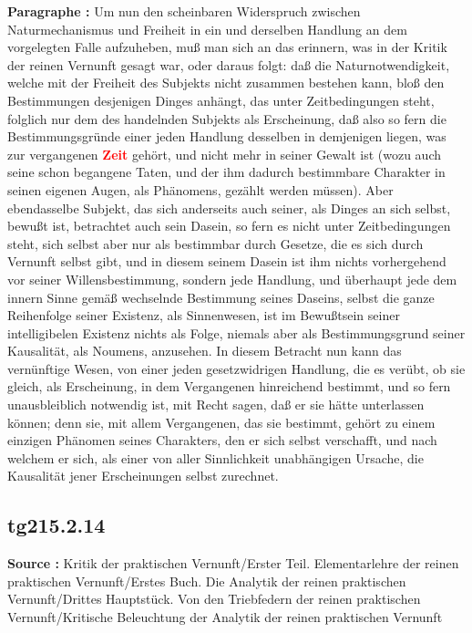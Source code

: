 \documentclass[a4paper,12pt,twoside]{book}
\newcommand{\match}[1]{\textcolor{red}{\textbf{#1}}}
\begin{document}
	\noindent\textbf{Paragraphe : }Um nun den scheinbaren Widerspruch zwischen Naturmechanismus und Freiheit in ein und derselben Handlung an dem vorgelegten Falle aufzuheben, muß man sich an das  erinnern, was in der Kritik der reinen Vernunft gesagt war, oder daraus folgt: daß die Naturnotwendigkeit, welche mit der Freiheit des Subjekts nicht zusammen bestehen kann, bloß den Bestimmungen desjenigen Dinges anhängt, das unter Zeitbedingungen steht, folglich nur dem des handelnden Subjekts als Erscheinung, daß also so fern die Bestimmungsgründe einer jeden Handlung desselben in demjenigen liegen, was zur vergangenen \match{Zeit} gehört, und nicht mehr in seiner Gewalt ist (wozu auch seine schon begangene Taten, und der ihm dadurch bestimmbare Charakter in seinen eigenen Augen, als Phänomens, gezählt werden müssen). Aber ebendasselbe Subjekt, das sich anderseits auch seiner, als Dinges an sich selbst, bewußt ist, betrachtet auch sein Dasein, so fern es nicht unter Zeitbedingungen steht, sich selbst aber nur als bestimmbar durch Gesetze, die es sich durch Vernunft selbst gibt, und in diesem seinem Dasein ist ihm nichts vorhergehend vor seiner Willensbestimmung, sondern jede Handlung, und überhaupt jede dem innern Sinne gemäß wechselnde Bestimmung seines Daseins, selbst die ganze Reihenfolge seiner Existenz, als Sinnenwesen, ist im Bewußtsein seiner intelligibelen Existenz nichts als Folge, niemals aber als Bestimmungsgrund seiner Kausalität, als Noumens, anzusehen. In diesem Betracht nun kann das vernünftige Wesen, von einer jeden gesetzwidrigen Handlung, die es verübt, ob sie gleich, als Erscheinung, in dem Vergangenen hinreichend bestimmt, und so fern unausbleiblich notwendig ist, mit Recht sagen, daß er sie hätte unterlassen können; denn sie, mit allem Vergangenen, das sie bestimmt, gehört zu einem einzigen Phänomen seines Charakters, den er sich selbst verschafft, und nach welchem er sich, als einer von aller Sinnlichkeit unabhängigen Ursache, die Kausalität jener Erscheinungen selbst zurechnet. 
	
	\subsection*{tg215.2.14} 
	\textbf{Source : }Kritik der praktischen Vernunft/Erster Teil. Elementarlehre der reinen praktischen Vernunft/Erstes Buch. Die Analytik der reinen praktischen Vernunft/Drittes Hauptstück. Von den Triebfedern der reinen praktischen Vernunft/Kritische Beleuchtung der Analytik der reinen praktischen Vernunft\\  
	
\end{document}
